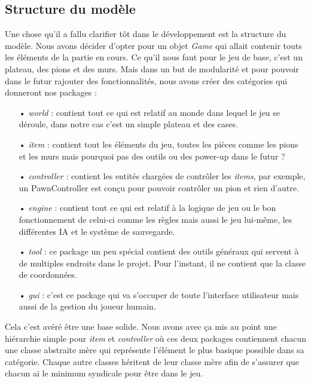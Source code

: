 \documentclass[a4paper, 12pt]{article}
\begin{document}
\subsection{Structure du modèle}
Une chose qu'il a fallu clarifier tôt dans le développement est la structure du modèle.
Nous avons décider d'opter pour un objet \textit{Game} qui allait contenir touts les éléments de la partie en cours. Ce qu'il nous faut pour le jeu de base, c'est un plateau, des pions et des murs. Mais dans un but de modularité et pour pouvoir dans le futur rajouter des fonctionnalités, nous avons créer des catégories qui donneront nos packages :
\begin{itemize}
\item[•] \textit{world} : contient tout ce qui est relatif au monde dans lequel le jeu se déroule, dans notre cas c'est un simple plateau et des cases.
\item[•] \textit{item} : contient tout les éléments du jeu, toutes les pièces comme les pions et les murs mais pourquoi pas des outils ou des power-up dans le futur ?
\item[•] \textit{controller} : contient les entités chargées de contrôler les \textit{items}, par exemple, un PawnController est conçu pour pouvoir contrôler un pion et rien d'autre.
\item[•] \textit{engine} : contient tout ce qui est relatif à la logique de jeu ou le bon fonctionnement de celui-ci comme les règles mais aussi le jeu lui-même, les différentes IA et le système de sauvegarde.
\item[•] \textit{tool} : ce package un peu spécial contient des outils généraux qui servent à de multiples endroits dans le projet. Pour l'instant, il ne contient que la classe de coordonnées.
\item[•] \textit{gui} : c'est ce package qui va s'occuper de toute l'interface utilisateur mais aussi de la gestion du joueur humain.
\end{itemize}
Cela c'est avéré être une base solide. Nous avons avec ça mis au point une hiérarchie simple pour \textit{item} et \textit{controller} où ces deux packages contiennent chacun une classe abstraite mère qui représente l'élément le plus basique possible dans sa catégorie. Chaque autre classes héritent de leur classe mère afin de s'assurer que chacun ai le minimum syndicale pour être dans le jeu.
\end{document}
